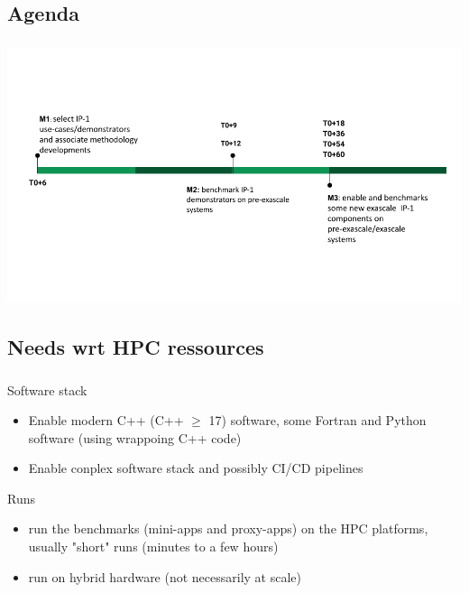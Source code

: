 \subsection{Agenda}
\begin{frame}
  \frametitle{\insertsectionhead}
  \framesubtitle{\insertsubsectionhead}

  \includegraphics[width=\linewidth]{../../figures/exama-timeline.png}
\end{frame}

\subsection{Needs wrt HPC ressources} 
\begin{frame}
  \frametitle{\insertsectionhead}
  \framesubtitle{\insertsubsectionhead}
  
  Software stack
  \begin{itemize}
    \item Enable modern C++ (C++ $\geq$ 17) software, some Fortran and Python software (using wrappoing C++ code)
    \item Enable conplex software stack and possibly CI/CD pipelines
  \end{itemize}

  Runs
  \begin{itemize}
    \item run the benchmarks (mini-apps and proxy-apps) on the HPC platforms, usually "short" runs (minutes to a few hours)
    \item run on hybrid hardware (not necessarily at scale)
  \end{itemize} 


\end{frame}


